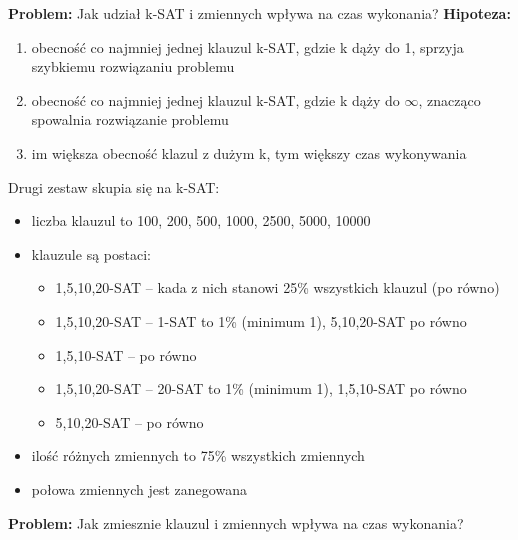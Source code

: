 \documentclass[a4paper,12pt]{article}
\begin{document}
\noindent
\textbf{Problem:} Jak udział k-SAT i zmiennych wpływa na czas wykonania?
\newline
\textbf{Hipoteza:}
\begin{enumerate}
  \item obecność co najmniej jednej klauzul k-SAT, gdzie k dąży do 1, sprzyja szybkiemu rozwiązaniu problemu
  \item obecność co najmniej jednej klauzul k-SAT, gdzie k dąży do $\infty$, znacząco spowalnia rozwiązanie problemu
  \item im większa obecność klazul z dużym k, tym większy czas wykonywania
\end{enumerate}

Drugi zestaw skupia się na k-SAT:
\begin{itemize}
  \item liczba klauzul to 100, 200, 500, 1000, 2500, 5000, 10000
  \item klauzule są postaci:
    \begin{itemize}
      \item 1,5,10,20-SAT -- kada z nich stanowi 25\% wszystkich klauzul (po równo)
      \item 1,5,10,20-SAT -- 1-SAT to 1\% (minimum 1), 5,10,20-SAT po równo
      \item 1,5,10-SAT -- po równo
      \item 1,5,10,20-SAT -- 20-SAT to 1\% (minimum 1), 1,5,10-SAT po równo
      \item 5,10,20-SAT -- po równo
    \end{itemize}
  \item ilość różnych zmiennych to 75\% wszystkich zmiennych
  \item połowa zmiennych jest zanegowana
\end{itemize}

\noindent
\textbf{Problem:} Jak zmiesznie klauzul i zmiennych wpływa na czas wykonania?
\end{document}
